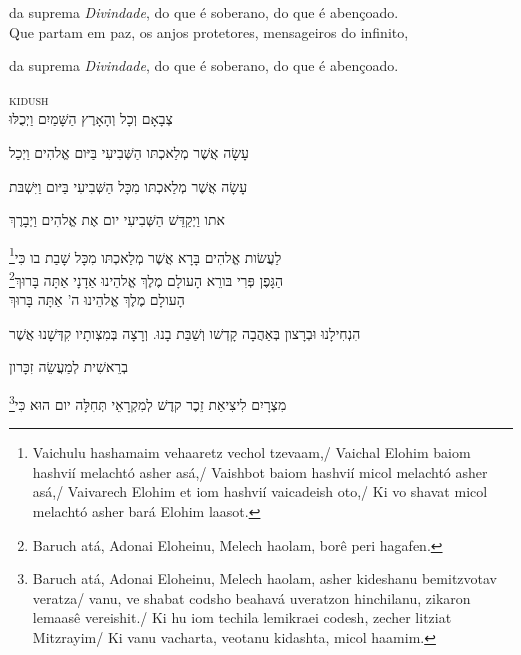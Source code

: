 da suprema \emph{Divindade}, do que é soberano, do que é \qb{}abençoado.\\[10pt]

Que partam em paz, os anjos protetores, mensageiros do \qb{}infinito,

da suprema \emph{Divindade}, do que é soberano, do que é \qb{}abençoado.



\movetoevenpage
\raggedleft


\vspace*{1cm}

\textsc{kidush}\\[15pt]

צְבָאָם וְכָל וְהָאָרֶץ הַשָּׁמַיִם וַיְכֻלּוּ 

עָשָׂה אֲשֶׁר מְלַאכְתּו הַשְּׁבִיעִי בַּיּום אֱלהִים וַיְכַל 

עָשָׂה אֲשֶׁר מְלַאכְתּו מִכָּל הַשְּׁבִיעִי בַּיּום וַיִּשְׁבּת 

אתו וַיְקַדֵּשׁ הַשְּׁבִיעִי יום אֶת אֱלהִים וַיְבָרֶךְ 

לַעֲשׂות אֱלהִים בָּרָא אֲשֶׁר מְלַאכְתּו מִכָּל שָׁבַת בו כִּי\footnote{Vaichulu hashamaim vehaaretz vechol tzevaam,/
Vaichal Elohim baiom hashvií melachtó asher asá,/
Vaishbot baiom hashvií micol melachtó asher asá,/
Vaivarech Elohim et iom hashvií vaicadeish oto,/
Ki vo shavat micol melachtó asher bará Elohim laasot.}\\[10pt] 

הַגָּפֶן פְּרִי בּורֵא הָעולָם מֶלֶךְ אֱלהֵינוּ אַדָנָי אַתָּה בָּרוּךְ\footnote{Baruch atá, Adonai Eloheinu, Melech haolam, borê peri hagafen.}\\[10pt] 

הָעולָם מֶלֶךְ אֱלהֵינוּ ה' אַתָּה בָּרוּךְ

הִנְחִילָנוּ וּבְרָצון בְּאַהֲבָה קָדְשׁו וְשַׁבַּת בָנוּ. וְרָצָה בְּמִצְותָיו קִדְּשָׁנוּ אֲשֶׁר

בְרֵאשִׁית לְמַעֲשֵׂה זִכָּרון

מִצְרָיִם לִיצִיאַת זֵכֶר קדֶשׁ לְמִקְרָאֵי תְּחִלָּה יום הוּא כִּי\footnote{Baruch atá, Adonai Eloheinu, Melech haolam, asher kideshanu bemitzvotav veratza/
vanu, ve shabat codsho beahavá uveratzon hinchilanu, zikaron lemaasê vereishit./
Ki hu iom techila lemikraei codesh, zecher litziat Mitzrayim/ Ki vanu vacharta, veotanu kidashta, micol haamim.}\\[10pt]


\movetooddpage
\raggedright

